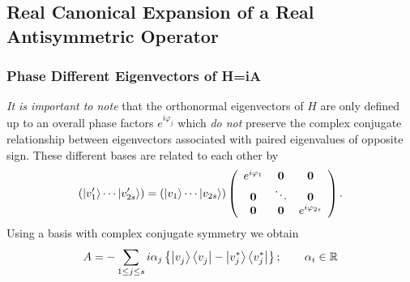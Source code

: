 \subsection{Real Canonical Expansion of a Real Antisymmetric Operator}

\subsubsection{Phase Different Eigenvectors of H\thinspace =\thinspace iA}

{\em It is important to note} that the orthonormal eigenvectors of $H$ are
only defined up to an overall phase factors $e^{i\varphi _{j}}$ which {\em %
do not} preserve the complex conjugate relationship between eigenvectors
associated with paired eigenvalues of opposite sign. These different bases
are related to each other by 
\begin{equation}
\left( \left\vert v_{1}^{\prime }\right\rangle \cdots \left\vert
v_{2s}^{\prime }\right\rangle \right) =\left( \left\vert v_{1}\right\rangle
\cdots \left\vert v_{2s}\right\rangle \right) \left( 
\begin{array}{ccc}
e^{i\varphi _{1}} & {\bf 0} & {\bf 0} \\ 
{\bf 0} & \ddots & {\bf 0} \\ 
{\bf 0} & {\bf 0} & e^{i\varphi _{2s}}%
\end{array}%
\right) .
\end{equation}%
Using a basis with complex conjugate symmetry we obtain 
\begin{equation}
A={\cal -}\sum_{1\leq j\leq s}i\alpha _{j}\left\{ \left\vert
v_{j}^{{}}\right\rangle \left\langle v_{j}^{{}}\right\vert -\left\vert
v_{j}^{\ast }\right\rangle \left\langle v_{j}^{\ast }\right\vert \right\}
;\qquad \alpha _{i}\in {\Bbb R}
\end{equation}

